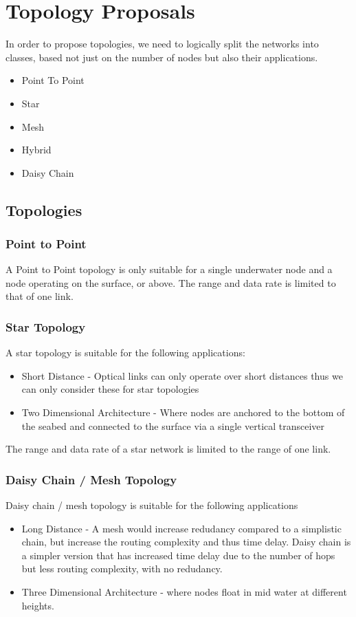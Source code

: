 \section{Topology Proposals}
In order to propose topologies, we need to logically split the networks into
classes, based not just on the number of nodes but also their applications.

\begin{itemize}
\item{Point To Point}
\item{Star}
\item{Mesh}
\item{Hybrid}
\item{Daisy Chain}
\end{itemize}

\subsection{Topologies}

\subsubsection{Point to Point}
A Point to Point topology is only suitable for a single underwater node and a
node operating on the surface, or above. The range and data rate is limited
to that of one link.

\subsubsection{Star Topology}
A star topology is suitable for the following applications:
\begin{itemize}
\item{Short Distance - Optical links can only operate over short distances thus
we can only consider these for star topologies}
\item{Two Dimensional Architecture \cite{POMPILI2009778} - Where nodes are
anchored to the bottom of the seabed and connected to the surface via a single
vertical transceiver}
\end{itemize}

The range and data rate of a star network is limited to the range of one link.

\subsubsection{Daisy Chain / Mesh Topology}
Daisy chain / mesh topology is suitable for the following applications
\begin{itemize}
\item{Long Distance - A mesh would increase redudancy compared to a simplistic
chain, but increase the routing complexity and thus time delay. Daisy chain is
a simpler version that has increased time delay due to the number of hops
but less routing complexity, with no redudancy.}
\item{Three Dimensional Architecture \cite{POMPILI2009778} - where nodes float
in mid water at different heights.}
\end{itemize}

